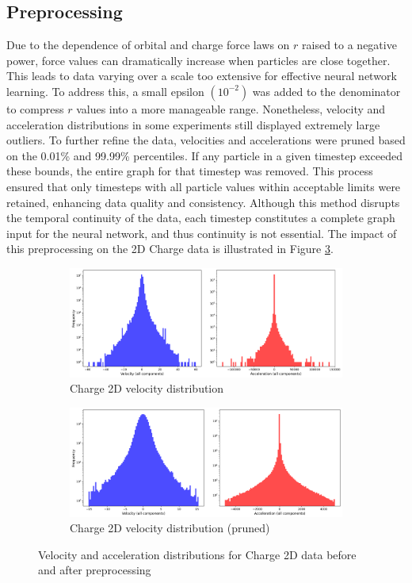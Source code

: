 \documentclass[11pt]{article}
\begin{document}
\subsection{Preprocessing}
Due to the dependence of orbital and charge force laws on \(r\) raised to a negative power, force values can dramatically increase when particles are close together. This leads to data varying over a scale too extensive for effective neural network learning. To address this, a small epsilon \((10^{-2})\) was added to the denominator to compress \(r\) values into a more manageable range. Nonetheless, velocity and acceleration distributions in some experiments still displayed extremely large outliers. To further refine the data, velocities and accelerations were pruned based on the 0.01\% and 99.99\% percentiles. If any particle in a given timestep exceeded these bounds, the entire graph for that timestep was removed. This process ensured that only timesteps with all particle values within acceptable limits were retained, enhancing data quality and consistency. Although this method disrupts the temporal continuity of the data, each timestep constitutes a complete graph input for the neural network, and thus continuity is not essential. The impact of this preprocessing on the 2D Charge data is illustrated in Figure \ref{fig:distributions}.

\begin{figure}[H]
    \centering
    \begin{subfigure}{0.9\textwidth}
        \includegraphics[width=\textwidth]{figs/charge_2_accel_vel_dist_unpruned.png}
        \caption{Charge 2D velocity distribution}
        \label{fig:charge_2_vel_dist_unpruned}
    \end{subfigure}
    \begin{subfigure}{0.9\textwidth}
        \includegraphics[width=\textwidth]{figs/charge_2_accel_vel_dist_pruned.png}
        \caption{Charge 2D velocity distribution (pruned)}
        \label{fig:charge_2_vel_dist_pruned}
    \end{subfigure}
    \caption{Velocity and acceleration distributions for Charge 2D data before and after preprocessing}
    \label{fig:distributions}
\end{figure}
\end{document}
